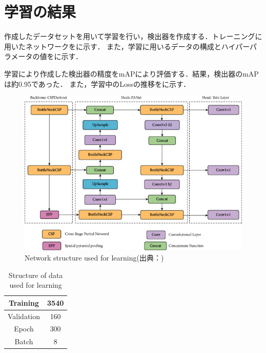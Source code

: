\documentclass[../main]{subfiles}
\begin{document}
        \clearpage

        \section{学習の結果}
        作成したデータセットを用いて学習を行い，検出器を作成する．トレーニングに用いたネットワークをに示す．
        また，学習に用いるデータの構成とハイパーパラメータの値をに示す．
        

        学習により作成した検出器の精度をmAPにより評価する．結果，検出器のmAPは約0.95であった．
        また，学習中のLossの推移をに示す．

        \begin{figure}[H]
         \centering
         \includegraphics[scale=0.65]{../images/yolov5_architecture.jpg}
         \caption{Network structure used for learning(出典：\cite{yolov5_figure})}
         \label{figure::yolov5_architecture}
        \end{figure}

        \begin{table}[H]
            \caption{Structure of data used for learning}
            \centering
            \label{table::learning}
            \begin{tabular}{l|l}
            \hline
            \multicolumn{1}{c|}{Training}   & \multicolumn{1}{c}{3540}                \\ \hline
            \multicolumn{1}{c|}{Validation} & \multicolumn{1}{c}{160}                  \\ \hline
            \multicolumn{1}{c|}{Epoch}      & \multicolumn{1}{c}{300}                \\ \hline
            \multicolumn{1}{c|}{Batch}      & \multicolumn{1}{c}{8}                   \\ \hline
            \end{tabular}
        \end{table}
\end{document}
